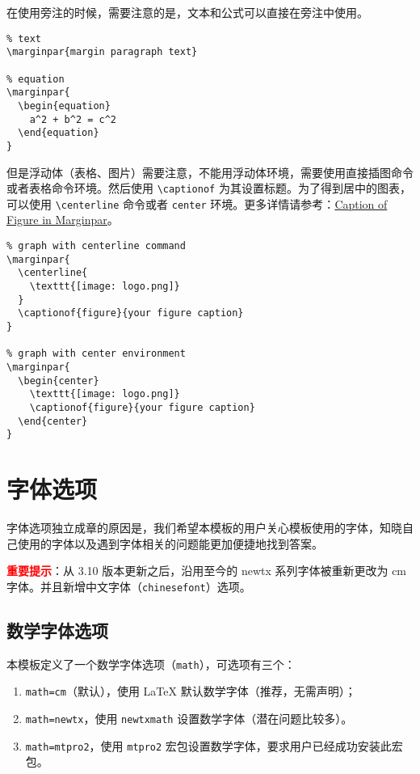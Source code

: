 \documentclass[lang=cn,10pt]{elegantbook}
\begin{document}
\begin{remark}
在使用旁注的时候，需要注意的是，文本和公式可以直接在旁注中使用。

\begin{lstlisting}
% text
\marginpar{margin paragraph text}

% equation
\marginpar{
  \begin{equation}
    a^2 + b^2 = c^2
  \end{equation}
}
\end{lstlisting}

但是浮动体（表格、图片）需要注意，不能用浮动体环境，需要使用直接插图命令或者表格命令环境。然后使用 \lstinline{\captionof} 为其设置标题。为了得到居中的图表，可以使用 \lstinline{\centerline} 命令或者 \lstinline{center} 环境。更多详情请参考：\href{https://tex.stackexchange.com/questions/5583/caption-of-figure-in-marginpar-and-caption-of-wrapfigure-in-margin}{Caption of Figure in Marginpar}。

\begin{lstlisting}
% graph with centerline command
\marginpar{
  \centerline{
    \texttt{[image: logo.png]}
  }
  \captionof{figure}{your figure caption}
}

% graph with center environment
\marginpar{
  \begin{center}
    \texttt{[image: logo.png]}
    \captionof{figure}{your figure caption}
  \end{center}
}
\end{lstlisting}

\end{remark}

\chapter{字体选项}
字体选项独立成章的原因是，我们希望本模板的用户关心模板使用的字体，知晓自己使用的字体以及遇到字体相关的问题能更加便捷地找到答案。

\textcolor{red}{\bfseries 重要提示}：从 3.10 版本更新之后，沿用至今的 newtx 系列字体被重新更改为 cm 字体。并且新增中文字体（\lstinline{chinesefont}）选项。

\section{数学字体选项}

本模板定义了一个数学字体选项（\lstinline{math}），可选项有三个：
\begin{enumerate}
  \item \lstinline{math=cm}（默认），使用 \LaTeX{} 默认数学字体（推荐，无需声明）；
  \item \lstinline{math=newtx}，使用 \lstinline{newtxmath} 设置数学字体（潜在问题比较多）。
  \item \lstinline{math=mtpro2}，使用 \lstinline{mtpro2} 宏包设置数学字体，要求用户已经成功安装此宏包。
\end{enumerate}
\end{document}
